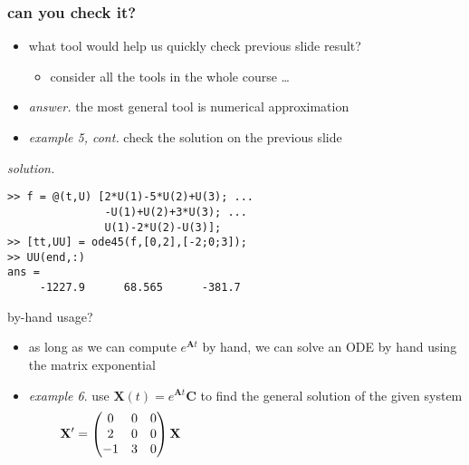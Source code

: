 \documentclass[dvipsnames,colorlinks]{beamer}
\newcommand{\bA}{\mathbf{A}}
\newcommand{\bC}{\mathbf{C}}
\newcommand{\bX}{\mathbf{X}}
\begin{document}
\begin{frame}[fragile]
\frametitle{can you check it?}

\begin{itemize}
\item what tool would help us quickly check previous slide result?
    \begin{itemize}
    \item consider all the tools in the whole course \dots
    \end{itemize}
\item \emph{answer.}  the most general tool is \alert{numerical approximation}

\bigskip
\item \emph{example 5, cont.}  check the solution on the previous slide
\end{itemize}

\noindent \emph{solution.}
\begin{Verbatim}[fontsize=\small]
>> f = @(t,U) [2*U(1)-5*U(2)+U(3); ...
               -U(1)+U(2)+3*U(3); ...
               U(1)-2*U(2)-U(3)];
>> [tt,UU] = ode45(f,[0,2],[-2;0;3]);
>> UU(end,:)
ans =
     -1227.9      68.565      -381.7
\end{Verbatim}
\end{frame}


\begin{frame}{by-hand usage?}

\begin{itemize}
\item as long as we can compute $e^{\bA t}$ by hand, we can solve an ODE by hand using the matrix exponential
\item \emph{example 6}.  use $\bX(t)=e^{\bA t}\bC$ to find the general solution of the given system
    $$\bX' = \begin{pmatrix} 0 & 0 & 0 \\ 2 & 0 & 0 \\ -1 & 3 & 0 \end{pmatrix} \bX    \hspace{70mm}$$
\end{itemize}

\vspace{40mm}
\end{frame}
\end{document}
